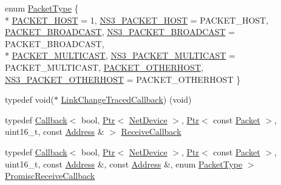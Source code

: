 \begin{DoxyCompactItemize}
\item 
enum \hyperlink{classns3_1_1NetDevice_ace65153f09144f55a0d3e702fc29d6b2}{Packet\+Type} \{ \\*
\hyperlink{classns3_1_1NetDevice_ace65153f09144f55a0d3e702fc29d6b2a60835731aced24ac0c712ba61e62462e}{P\+A\+C\+K\+E\+T\+\_\+\+H\+O\+ST} = 1, 
\hyperlink{classns3_1_1NetDevice_ace65153f09144f55a0d3e702fc29d6b2a4f3acc25ea8b98021b5c610b899ae7d8}{N\+S3\+\_\+\+P\+A\+C\+K\+E\+T\+\_\+\+H\+O\+ST} = P\+A\+C\+K\+E\+T\+\_\+\+H\+O\+ST, 
\hyperlink{classns3_1_1NetDevice_ace65153f09144f55a0d3e702fc29d6b2adfeb6a2929cee183836a32fe293ce205}{P\+A\+C\+K\+E\+T\+\_\+\+B\+R\+O\+A\+D\+C\+A\+ST}, 
\hyperlink{classns3_1_1NetDevice_ace65153f09144f55a0d3e702fc29d6b2a851cdec39029ae1f3de8955e9b33eb9c}{N\+S3\+\_\+\+P\+A\+C\+K\+E\+T\+\_\+\+B\+R\+O\+A\+D\+C\+A\+ST} = P\+A\+C\+K\+E\+T\+\_\+\+B\+R\+O\+A\+D\+C\+A\+ST, 
\\*
\hyperlink{classns3_1_1NetDevice_ace65153f09144f55a0d3e702fc29d6b2ae3ffb88d364e97f06f662f5d7ba53bbe}{P\+A\+C\+K\+E\+T\+\_\+\+M\+U\+L\+T\+I\+C\+A\+ST}, 
\hyperlink{classns3_1_1NetDevice_ace65153f09144f55a0d3e702fc29d6b2a46d4c29c98b4c198f24310ce69f43dc3}{N\+S3\+\_\+\+P\+A\+C\+K\+E\+T\+\_\+\+M\+U\+L\+T\+I\+C\+A\+ST} = P\+A\+C\+K\+E\+T\+\_\+\+M\+U\+L\+T\+I\+C\+A\+ST, 
\hyperlink{classns3_1_1NetDevice_ace65153f09144f55a0d3e702fc29d6b2a60c00fab4286dd2903e2b197a9f8c6c8}{P\+A\+C\+K\+E\+T\+\_\+\+O\+T\+H\+E\+R\+H\+O\+ST}, 
\hyperlink{classns3_1_1NetDevice_ace65153f09144f55a0d3e702fc29d6b2a16d8e18aea18b500b8f18de6d52c884d}{N\+S3\+\_\+\+P\+A\+C\+K\+E\+T\+\_\+\+O\+T\+H\+E\+R\+H\+O\+ST} = P\+A\+C\+K\+E\+T\+\_\+\+O\+T\+H\+E\+R\+H\+O\+ST
 \}
\item 
typedef void($\ast$ \hyperlink{classns3_1_1NetDevice_a4d51d459158d62dd41727a9d46f15aba}{Link\+Change\+Traced\+Callback}) (void)
\item 
typedef \hyperlink{classns3_1_1Callback}{Callback}$<$ bool, \hyperlink{classns3_1_1Ptr}{Ptr}$<$ \hyperlink{classns3_1_1NetDevice}{Net\+Device} $>$, \hyperlink{classns3_1_1Ptr}{Ptr}$<$ const \hyperlink{classns3_1_1Packet}{Packet} $>$, uint16\+\_\+t, const \hyperlink{classns3_1_1Address}{Address} \& $>$ \hyperlink{classns3_1_1NetDevice_ad5e5e1ca187472bc2ba99575d8def568}{Receive\+Callback}
\item 
typedef \hyperlink{classns3_1_1Callback}{Callback}$<$ bool, \hyperlink{classns3_1_1Ptr}{Ptr}$<$ \hyperlink{classns3_1_1NetDevice}{Net\+Device} $>$, \hyperlink{classns3_1_1Ptr}{Ptr}$<$ const \hyperlink{classns3_1_1Packet}{Packet} $>$, uint16\+\_\+t, const \hyperlink{classns3_1_1Address}{Address} \&, const \hyperlink{classns3_1_1Address}{Address} \&, enum \hyperlink{classns3_1_1NetDevice_ace65153f09144f55a0d3e702fc29d6b2}{Packet\+Type} $>$ \hyperlink{classns3_1_1NetDevice_a427225795919f26c414bee2ea3f31ed2}{Promisc\+Receive\+Callback}
\end{DoxyCompactItemize}

